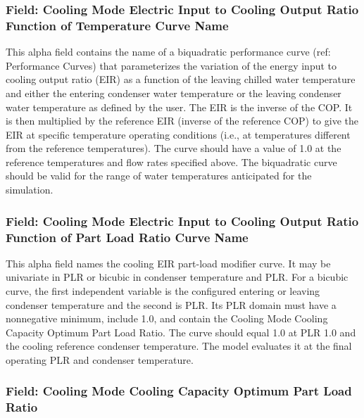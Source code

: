 \subsubsection{Field: Cooling Mode Electric Input to Cooling Output Ratio Function of Temperature Curve Name}\label{field-cooling-mode-electric-input-to-cooling-output-ratio-function-of-temperature-curve-name}

This alpha field contains the name of a biquadratic performance curve (ref: Performance Curves) that parameterizes the variation of the energy input to cooling output ratio (EIR) as a function of the leaving chilled water temperature and either the entering condenser water temperature or the leaving condenser water temperature as defined by the user. The EIR is the inverse of the COP. It is then multiplied by the reference EIR (inverse of the reference COP) to give the EIR at specific temperature operating conditions (i.e., at temperatures different from the reference temperatures). The curve should have a value of 1.0 at the reference temperatures and flow rates specified above. The biquadratic curve should be valid for the range of water temperatures anticipated for the simulation.

\subsubsection{Field: Cooling Mode Electric Input to Cooling Output Ratio Function of Part Load Ratio Curve Name}\label{field-cooling-mode-electric-input-to-cooling-output-ratio-function-of-part-load-ratio-curve-name}

This alpha field names the cooling EIR part-load modifier curve. It may be univariate in PLR or bicubic in condenser temperature and PLR. For a bicubic curve, the first independent variable is the configured entering or leaving condenser temperature and the second is PLR. Its PLR domain must have a nonnegative minimum, include 1.0, and contain the Cooling Mode Cooling Capacity Optimum Part Load Ratio. The curve should equal 1.0 at PLR 1.0 and the cooling reference condenser temperature. The model evaluates it at the final operating PLR and condenser temperature.

\subsubsection{Field: Cooling Mode Cooling Capacity Optimum Part Load Ratio}\label{field-cooling-mode-cooling-capacity-optimum-part-load-ratio}

